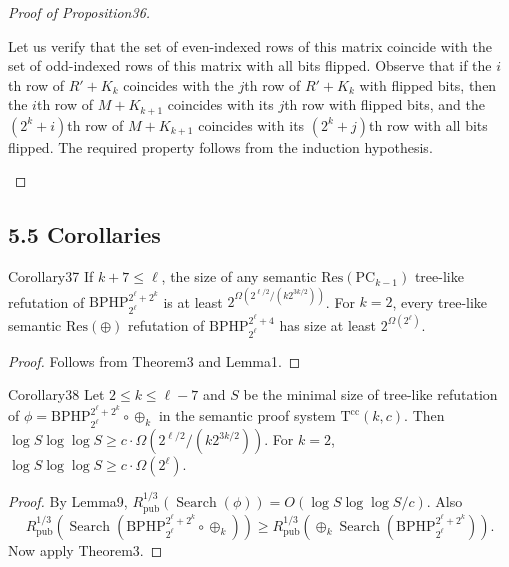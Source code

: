 \begin{proof}[Proof of Proposition36]
\begin{enumerate}
Let us verify that the set of even-indexed rows of this matrix coincide with the set of odd-indexed rows of this matrix with all bits flipped. Observe that if the $i$th row of $R'+K_k$ coincides with the $j$th row of $R'+K_k$ with flipped bits, then the $i$th row of $M+K_{k+1}$ coincides with its $j$th row with flipped bits, and the $(2^k+i)$th row of $M+K_{k+1}$ coincides with its $(2^k+j)$th row with all bits flipped. The required property follows from the induction hypothesis.
\end{enumerate}
\end{proof}
\subsection*{5.5 Corollaries}
\begin{authorclaim}{Corollary37}
If $k+7\le\ell$, the size of any semantic $\mathrm{Res}(\mathrm{PC}_{k-1})$ tree-like refutation of $\mathrm{BPHP}_{2^\ell}^{2^\ell+2^k}$ is at least $2^{\Omega(2^{\ell/2}/(k2^{3k/2}))}$. For $k=2$, every tree-like semantic $\mathrm{Res}(\oplus)$ refutation of $\mathrm{BPHP}_{2^\ell}^{2^\ell+4}$ has size at least $2^{\Omega(2^\ell)}$.
\end{authorclaim}
\begin{proof}
Follows from Theorem3 and Lemma1.
\end{proof}
\begin{authorclaim}{Corollary38}
Let $2\le k\le\ell-7$ and $S$ be the minimal size of tree-like refutation of $\phi=\mathrm{BPHP}_{2^\ell}^{2^\ell+2^k}\circ\oplus_k$ in the semantic proof system $\mathrm T^{\mathrm{cc}}(k,c)$. Then
$\log S\log\log S\ge c\cdot\Omega(2^{\ell/2}/(k2^{3k/2}))$.
For $k=2$, $\log S\log\log S\ge c\cdot\Omega(2^\ell)$.
\end{authorclaim}
\begin{proof}
By Lemma9, $R^{1/3}_{\mathrm{pub}}(\operatorname{Search}(\phi))=O(\log S\log\log S/c)$. Also
\[
R^{1/3}_{\mathrm{pub}}(\operatorname{Search}(\mathrm{BPHP}_{2^\ell}^{2^\ell+2^k}\circ\oplus_k))
\ge R^{1/3}_{\mathrm{pub}}(\oplus_k\operatorname{Search}(\mathrm{BPHP}_{2^\ell}^{2^\ell+2^k})).
\]
Now apply Theorem3.
\end{proof}
